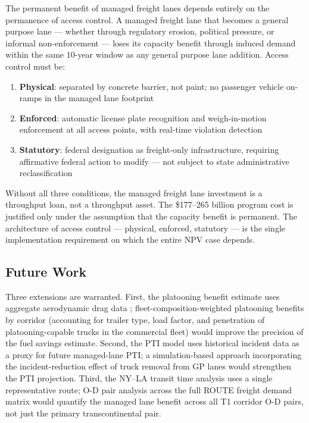 The permanent benefit of managed freight lanes depends entirely on the permanence of access control. A managed freight lane that becomes a general purpose lane --- whether through regulatory erosion, political pressure, or informal non-enforcement --- loses its capacity benefit through induced demand within the same 10-year window as any general purpose lane addition. Access control must be:

\begin{enumerate}
\item \textbf{Physical}: separated by concrete barrier, not paint; no passenger vehicle on-ramps in the managed lane footprint
\item \textbf{Enforced}: automatic license plate recognition and weigh-in-motion enforcement at all access points, with real-time violation detection
\item \textbf{Statutory}: federal designation as freight-only infrastructure, requiring affirmative federal action to modify --- not subject to state administrative reclassification
\end{enumerate}

Without all three conditions, the managed freight lane investment is a throughput loan, not a throughput asset. The \$177--265 billion program cost is justified only under the assumption that the capacity benefit is permanent. The architecture of access control --- physical, enforced, statutory --- is the single implementation requirement on which the entire NPV case depends.

\subsection*{Future Work}

Three extensions are warranted. First, the platooning benefit estimate uses aggregate aerodynamic drag data \citep{Browand2004}; fleet-composition-weighted platooning benefits by corridor (accounting for trailer type, load factor, and penetration of platooning-capable trucks in the commercial fleet) would improve the precision of the fuel savings estimate. Second, the PTI model uses historical incident data as a proxy for future managed-lane PTI; a simulation-based approach incorporating the incident-reduction effect of truck removal from GP lanes would strengthen the PTI projection. Third, the NY--LA transit time analysis uses a single representative route; O-D pair analysis across the full ROUTE freight demand matrix \citep{ROUTE_C1} would quantify the managed lane benefit across all T1 corridor O-D pairs, not just the primary transcontinental pair.
